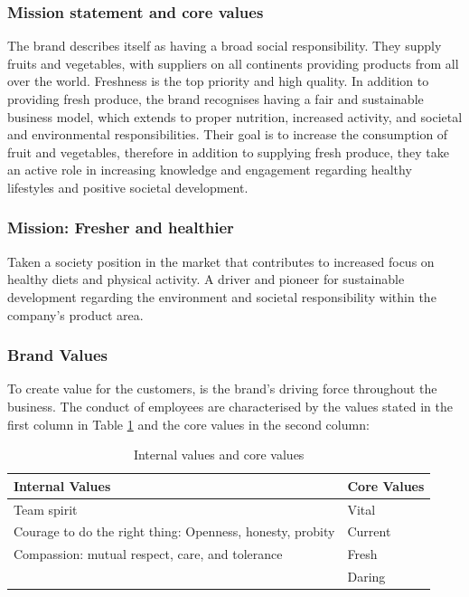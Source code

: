 \vspace{2,5mm}
    
        \subsubsection{Mission statement and core values}
 
        The brand describes itself as having a broad social responsibility. They supply fruits and vegetables, with suppliers on all continents providing products from all over the world. Freshness is the top priority and high quality. In addition to providing fresh produce, the brand recognises having a fair and sustainable business model, which extends to proper nutrition, increased activity, and societal and environmental responsibilities. Their goal is to increase the consumption of fruit and vegetables, therefore in addition to supplying fresh produce, they take an active role in increasing knowledge and engagement regarding healthy lifestyles and positive societal development.
 
\vspace{2,5mm}
  
        \subsubsection{Mission: Fresher and healthier}
        Taken a society position in the  market that contributes to increased focus on healthy diets and physical activity. A driver and pioneer for sustainable development regarding the environment and societal responsibility within the company’s product area.
        
\vspace{2,5mm}

        \subsubsection{Brand Values}
        
        To create value for the customers, is the brand's driving force throughout the business. The conduct of employees are characterised by the values stated in the first column in Table \ref{table:1} and the core values in the second column:
        
    \begin{table}[h]
    \begin{tabular}{ |p{9cm}||p{}|  }
     \hline
     Internal Values & Core Values \\
     \hline
        Team spirit & Vital \\
        Courage to do the right thing: Openness, honesty, probity & Current\\
        Compassion: mutual respect, care, and tolerance & Fresh \\
        & Daring    \\
     \hline
    \end{tabular}
    \caption{Internal values and core values}
    \label{table:1}
    \end{table}

